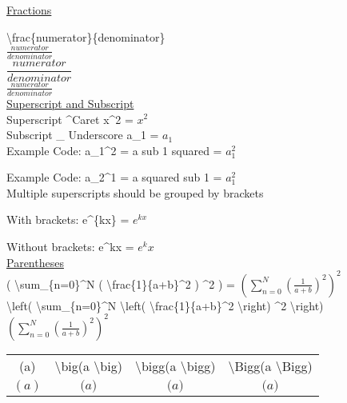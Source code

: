 \documentclass[a4paper, 12pt]{book}
\begin{document}
\underline{Fractions}

\textbackslash frac\{numerator\}\{denominator\}
\\

\( \frac{numerator}{denominator} \)
\\

\( \dfrac{numerator}{denominator} \)
\\

\( \tfrac{numerator}{denominator} \)
\\

\underline{Superscript and Subscript}
\\

Superscript \textasciicircum Caret x\textasciicircum2  = \( x^2 \)
\\

Subscript \_ Underscore a\_1 = \( a_1 \)
\\

Example Code: a\_1\textasciicircum2 = a sub 1 squared = \( a_1^2 \)

Example Code: a\_2\textasciicircum1 = a squared sub 1 = \( a^2_1 \)
\\

Multiple superscripts should be grouped by brackets

With brackets: e\textasciicircum\{kx\} = \( e^{kx} \)

Without brackets: e\textasciicircum kx = \( e^kx \)
\\

\underline{Parentheses}
\\

( \textbackslash sum\_\{n=0\}\textasciicircum N ( \textbackslash frac\{1\}\{a+b\}\textasciicircum 2 ) \textasciicircum 2 ) =
\( (\sum_{n=0}^N ( \frac{1}{a+b})^2 )^2 \)
\\

\textbackslash left( \textbackslash sum\_\{n=0\}\textasciicircum N \textbackslash left( \textbackslash frac\{1\}\{a+b\}\textasciicircum 2 \textbackslash right) \textasciicircum 2 \textbackslash right)
\( \left(\sum_{n=0}^N \left( \frac{1}{a+b}\right)^2 \right)^2 \)
\\


\begin{tabular}{cccc}
  (a) & \textbackslash big(a \textbackslash big) & \textbackslash bigg(a \textbackslash bigg) & \textbackslash Bigg(a \textbackslash Bigg) \\
  \( (a) \) & \( \big( a \big) \) & \( \bigg( a \bigg) \) & \( \Bigg( a \Bigg) \)
\end{tabular}
\end{document}
